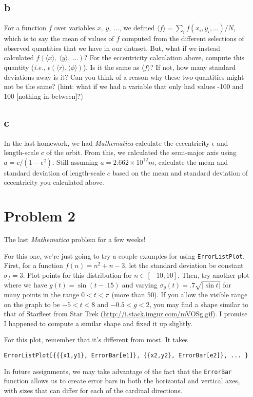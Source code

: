 \documentclass{article}
\begin{document}
\subsection{b}
For a function $f$ over variables $x,~y,~...$, we defined $\langle f\rangle=\sum_if(x_i, y_i, ...)/N$, which is to say the mean of values of $f$
computed from the different selections of observed quantities that
we have in our dataset. But, what if we instead calculated $f(\langle x\rangle,~\langle y\rangle,~...)$? For the eccentricity calculation above, compute this quantity
({\emph{i.e.,}} $\epsilon(\langle r\rangle, \langle\phi\rangle)$). Is it the same as $\langle f\rangle$? If not, how many standard deviations away is it? Can you think of a reason
why these two quantities might not be the same? (hint: what if we had a variable that only had values -100 and 100 [nothing in-between]?)

\subsection{c}
In the last homework, we had {\emph{Mathematica}} calculate the eccentricity $\epsilon$ and length-scale $c$ of the orbit. From this, we calculated
the semi-major axis using $a=c/(1-\epsilon^2)$. Still assuming $a=2.662\times10^{12}m$, calculate the mean and standard deviation of length-scale $c$ based on the mean and standard
deviation of eccentricity you calculated above.

\section{Problem 2}
The last {\emph{Mathematica}} problem for a few weeks!

For this one, we're just going to try a couple examples for using \texttt{ErrorListPlot}. First, for a function $f(n)=n^2+n-3$, let the standard deviation be constant $\sigma_f=3$. Plot points
for this distribution for $n\in[-10,10]$. Then, try another plot where we have $g(t)=\sin(t-.15)$ and varying $\sigma_g(t)=.7\sqrt{|\sin{t}|}$ for many points in the range $0<t<\pi$ (more
than 50). If you allow the visible range on the graph to be $-5<t<8$ and $-0.5<g<2$, you may find a shape similar to that of Starfleet from Star Trek (\url{http://i.stack.imgur.com/mVOSg.gif}).
I promise I happened to compute a similar shape and fixed it up slightly.

For this plot, remember that it's different from most. It takes
\begin{verbatim}
ErrorListPlot[{{{x1,y1}, ErrorBar[e1]}, {{x2,y2}, ErrorBar[e2]}, ... }
\end{verbatim}

In future assignments, we may take advantage of the fact that the \texttt{ErrorBar} function allows us to create error bars in both the horizontal and vertical axes, with
sizes that can differ for each of the cardinal directions.
\end{document}
